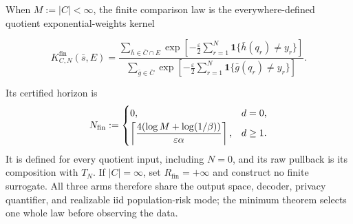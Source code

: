 When $M:=|C|<\infty$, the finite comparison law is the everywhere-defined
quotient exponential-weights kernel

\[
K^{\mathrm{fin}}_{C,N}(\bar s,E)=
\frac{\displaystyle\sum_{\bar h\in\bar C\cap E}
 \exp\!\left[-\frac{\varepsilon}{2}\sum_{r=1}^N
 \mathbf1\{\bar h(q_r)\ne y_r\}\right]}
 {\displaystyle\sum_{\bar g\in\bar C}
 \exp\!\left[-\frac{\varepsilon}{2}\sum_{r=1}^N
 \mathbf1\{\bar g(q_r)\ne y_r\}\right]}.
\]

Its certified horizon is
\[
 N_{\rm fin}:=
 \begin{cases}
 0,&d=0,\\[2pt]
 \displaystyle\left\lceil
 \frac{4(\log M+\log(1/\beta))}{\varepsilon\alpha}
 \right\rceil,&d\ge1.
 \end{cases}
\]
It is defined for every quotient input, including $N=0$, and its raw
pullback is its composition with $T_N$.  If $|C|=\infty$, set
$R_{\mathrm{fin}}=+\infty$ and construct no finite surrogate.  All three
arms therefore share the output space, decoder, privacy quantifier, and
realizable iid population-risk mode; the minimum theorem selects one whole
law before observing the data.
